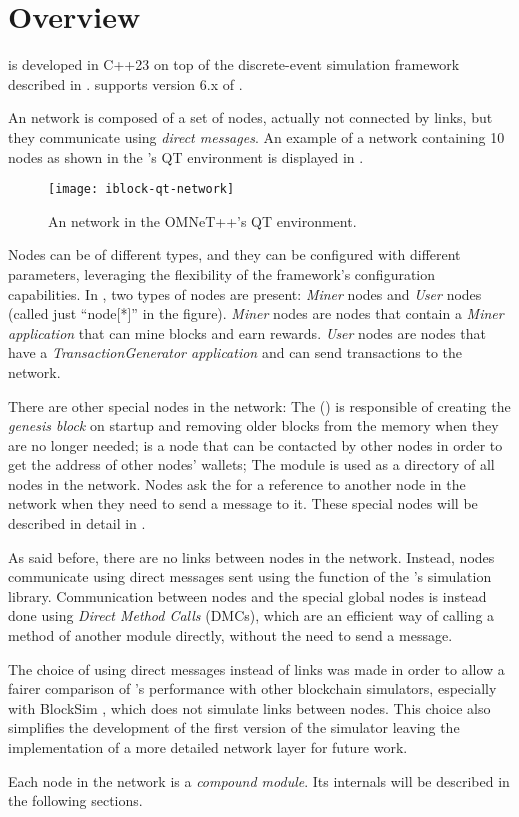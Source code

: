 \section{Overview}\label{sec:impl-overview}

\iblock{} is developed in C++23 on top of the \omnetpp{} discrete-event
simulation framework described in . \iblock{} supports
version 6.x of \omnetpp{}.

An \iblock{} network is composed of a set of nodes, actually not connected by
links, but they communicate using \emph{direct messages}. An example of a
network containing 10 nodes as shown in the \omnetpp{}'s QT environment is
displayed in .

\begin{figure}[tbhp]
	\centering
	\texttt{[image: iblock-qt-network]}
	\caption{An \iblock{} network in the OMNeT++'s QT
	environment.}\label{fig:iblock-network}
\end{figure}

Nodes can be of different types, and they can be configured with different
parameters, leveraging the flexibility of the \omnetpp{} framework's
configuration capabilities. In , two types of nodes
are present: \emph{Miner} nodes and \emph{User} nodes (called just ``node[*]''
in the figure). \emph{Miner} nodes are nodes that contain a \emph{Miner
application} that can mine blocks and earn rewards. \emph{User} nodes are nodes
that have a \emph{TransactionGenerator application} and can send transactions
to the network.

There are other special nodes in the network: The 
() is responsible of creating the \emph{genesis
block} on startup and removing older blocks from the memory when they are no
longer needed;  is a node that can be contacted by other
nodes in order to get the address of other nodes' wallets; The
 module is used as a directory of all nodes in the network.
Nodes ask the  for a reference to another node in the network
when they need to send a message to it. These special nodes will be described
in detail in .

As said before, there are no links between nodes in the network. Instead, nodes
communicate using direct messages sent using the  function
of the \omnetpp{}'s simulation library. Communication between nodes and the
special global nodes is instead done using \emph{Direct Method Calls} (DMCs),
which are an efficient way of calling a method of another module directly,
without the need to send a message.

The choice of using direct messages instead of links was made in order to allow
a fairer comparison of \iblock{}'s performance with other blockchain
simulators, especially with BlockSim \cite{blocksim}, which does not simulate
links between nodes. This choice also simplifies the development of the first
version of the simulator leaving the implementation of a more detailed network
layer for future work.

Each node in the network is a \emph{compound module}. Its internals will be
described in the following sections.
